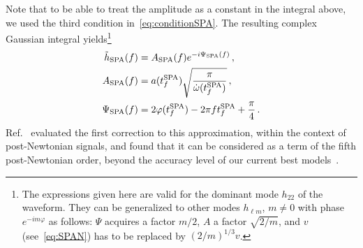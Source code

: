 \documentclass[aps,showpacs,twocolumn,
prd,superscriptaddress,nofootinbib]{revtex4-1}
\newcommand{\tfSPA}{t_{f}^{\rm SPA}}
\begin{document}
Note that to be able to treat the amplitude as a constant in the integral above, we used the third condition in~\eqref{eq:conditionSPA}. The resulting complex Gaussian integral yields\footnote{The expressions given here are valid for the dominant mode $h_{22}$ of the waveform. They can be generalized to other modes $h_{\ell m}$, $m\neq 0$ with phase $e^{-im\varphi}$ as follows: $\Psi$ acquires a factor $m/2$, $A$ a factor $\sqrt{2/m}$, and $v$ (see~\eqref{eq:SPAN}) has to be replaced by $(2/m)^{1/3} v$.}
\begin{subequations}
\begin{align}
	\tilde{h}_{\rm SPA}(f) &= A_{\rm SPA}(f) e^{-i\Psi_{\rm SPA}(f)} \,, \\
	A_{\rm SPA}(f) &= a(\tfSPA) \sqrt{\frac{\pi}{\dot{\omega}(\tfSPA)}} \,, \label{eq:ASPA} \\
	\Psi_{\rm SPA}(f) &= 2\varphi(\tfSPA) - 2\pi f \tfSPA + \frac{\pi}{4} \,. \label{eq:PsiSPA}
\end{align}
\end{subequations}
Ref.~\cite{Droz+99} evaluated the first correction to this approximation, within the context of post-Newtonian signals, and found that it can be considered as a term of the fifth post-Newtonian order, beyond the accuracy level of our current best models~\cite{BlanchetLiving}.
\end{document}
